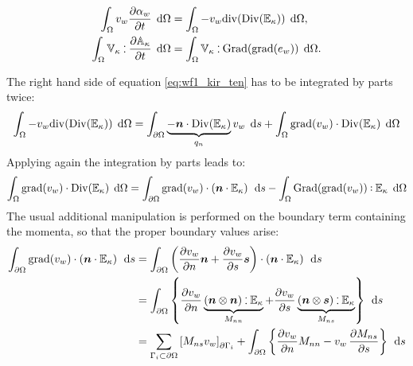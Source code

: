 \documentclass[preprint,12pt]{elsarticle}
\def\onedot{$\mathsurround0pt\ldotp$}
\def\cddot{%
	\mathbin{\vcenter{\baselineskip.67ex
			\hbox{\onedot}\hbox{\onedot}}%
}}
\begin{document}
\begin{align}
\int_{\Omega} v_w \diffp{\alpha_w}{t} \,  \d\Omega &=  \int_{\Omega} -v_w \mathrm{div}(\mathrm{Div}(\mathbb{E}_{\kappa})) \, \d\Omega,  \label{eq:wf1_kir_ten}\\
\int_{\Omega} \mathbb{V}_{\kappa} \cddot \diffp{\mathbb{A}_{\kappa}}{t} \,  \d\Omega &= \int_{\Omega} \mathbb{V}_{\kappa} \cddot  \mathrm{Grad}(\mathrm{grad}(e_w)) \,   \d\Omega.  \label{eq:wf2_kir_ten}
\end{align}

The right hand side of equation \eqref{eq:wf1_kir_ten} has to be integrated by parts twice:
\begin{equation}
\label{eq:line1_wf1_ten}
\int_{\Omega} - v_w \mathrm{div}(\mathrm{Div}(\mathbb{E}_{\kappa})) \, \d\Omega = \int_{\partial \Omega} \underbrace{- \bm{n} \cdot \mathrm{Div}(\mathbb{E}_{\kappa})}_{q_n} v_w \, \d{s} + \int_{\Omega} \mathrm{grad}(v_w)  \cdot \mathrm{Div}(\mathbb{E}_{\kappa}) \, \d\Omega
\end{equation}
Applying again the integration by parts leads to:
\begin{equation}
\label{eq:line1_wf2_ten}
\int_{\Omega} \mathrm{grad}(v_w)  \cdot \mathrm{Div}(\mathbb{E}_{\kappa}) \, \d\Omega = \int_{\partial \Omega} \mathrm{grad}(v_w)  \cdot \left( \bm{n} \cdot \mathbb{E}_{\kappa} \right) \, \d{s} -  \int_{\Omega}\mathrm{Grad}(\mathrm{grad}(v_w))  \cddot \mathbb{E}_{\kappa} \, \d\Omega
\end{equation}
The usual additional manipulation is performed on the boundary term containing the momenta, so that the proper boundary values arise:
\begin{equation}
\label{eq:line1_ipbc_ten}
\begin{aligned}
\int_{\partial \Omega} \mathrm{grad}(v_w)  \cdot \left( \bm{n} \cdot \mathbb{E}_{\kappa} \right) \, \d{s} &= \int_{\partial \Omega} \left(\diffp{v_w}{n} \bm{n} + \diffp{v_w}{s} \bm{s} \right)  \cdot \left( \bm{n} \cdot \mathbb{E}_{\kappa} \right) \, \d{s} \\
&= \int_{\partial \Omega} \left\{  \diffp{v_w}{n}  \underbrace{\left(\bm{n} \otimes \bm{n} \right) \cddot \mathbb{E}_{\kappa} }_{M_{nn}} +  \diffp{v_w}{s}  \underbrace{\left(\bm{n} \otimes \bm{s} \right) \cddot \mathbb{E}_{\kappa}}_{M_{ns}} \right\}  \, \d{s} \\
&= \sum_{\Gamma_{i} \subset \partial \Omega} \left[ M_{ns} v_w \right]_{\partial \Gamma_i} + \int_{\partial \Omega} \left\{ \diffp{v_w}{n} M_{nn}  - v_w \, \diffp{M_{ns}}{s} \right\} \, \d{s}
\end{aligned}
\end{equation}
\end{document}
